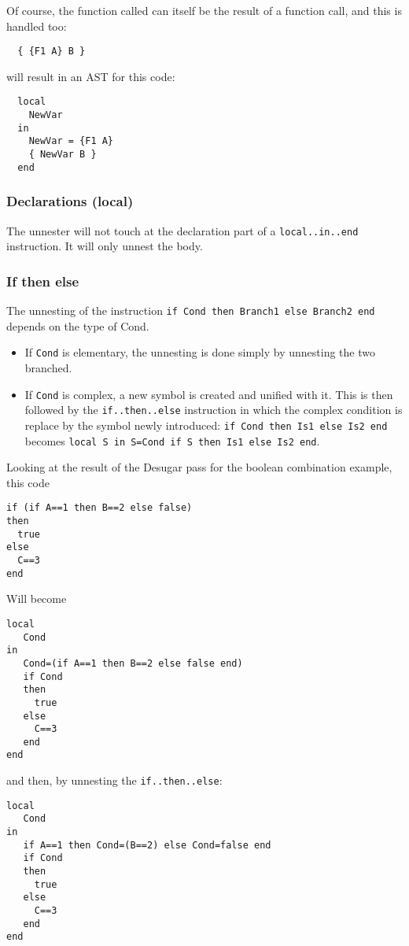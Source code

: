 \documentclass[a4paper]{memoir}
\begin{document}
Of course, the function called can itself be the result of a function call, and this is handled too:
\begin{lstlisting}
  { {F1 A} B }
\end{lstlisting}
will result in an AST for this code:
\begin{lstlisting}
  local
    NewVar
  in
    NewVar = {F1 A}
    { NewVar B }
  end
\end{lstlisting}

\subsubsection{Declarations (local)}
The unnester will not touch at the declaration part of a \lstinline!local..in..end! instruction. It will only unnest the body.
\subsubsection{If then else}
The unnesting of the instruction \lstinline!if Cond then Branch1 else Branch2 end! depends on the type of Cond. 
\begin{itemize}
  \item If \lstinline!Cond! is elementary, the unnesting is done simply by unnesting the two branched.
  \item If \lstinline!Cond! is complex, a new symbol is created and unified with it. This is then followed by the \lstinline!if..then..else! instruction in which the complex condition is replace by the symbol newly introduced:
    \lstinline!if Cond then Is1 else Is2 end! becomes \lstinline!local S in S=Cond if S then Is1 else Is2 end!.
\end{itemize}
Looking at the result of the Desugar pass for the boolean combination example, this code
\begin{lstlisting}
if (if A==1 then B==2 else false)
then
  true
else
  C==3
end
\end{lstlisting}

Will become

\begin{lstlisting}
local
   Cond
in
   Cond=(if A==1 then B==2 else false end)
   if Cond
   then
     true
   else
     C==3
   end
end
\end{lstlisting}
and then, by unnesting the \lstinline!if..then..else!:
\begin{lstlisting}
local
   Cond
in
   if A==1 then Cond=(B==2) else Cond=false end
   if Cond
   then
     true
   else
     C==3
   end
end
\end{lstlisting}
\end{document}

